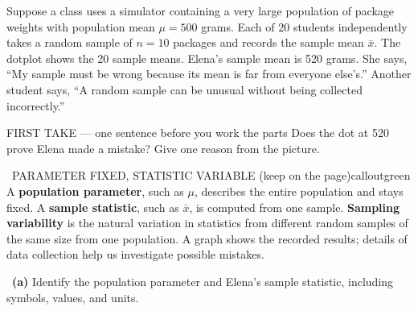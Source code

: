\documentclass[11pt]{article}
\begin{document}
Suppose a class uses a simulator containing a very large population of package weights with population mean $\mu=500$ grams. Each of 20 students independently takes a random sample of $n=10$ packages and records the sample mean $\bar{x}$. The dotplot shows the 20 sample means. Elena's sample mean is 520 grams. She says, ``My sample must be wrong because its mean is far from everyone else's.'' Another student says, ``A random sample can be unusual without being collected incorrectly.''\par
\begin{center}
\end{center}
\begin{firsttakebox}{FIRST TAKE --- one sentence before you work the parts}
Does the dot at 520 prove Elena made a mistake? Give one reason from the picture.\par
{}
\end{firsttakebox}

\begin{callout}{\IconBook\ PARAMETER FIXED, STATISTIC VARIABLE (keep on the page)}{calloutgreen}
A \textbf{population parameter}, such as $\mu$, describes the entire population and stays fixed.
A \textbf{sample statistic}, such as $\bar{x}$, is computed from one sample.
\textbf{Sampling variability} is the natural variation in statistics from different random samples of the same size from one population.
A graph shows the recorded results; details of data collection help us investigate possible mistakes.
\end{callout}

~\textbf{(a)} Identify the population parameter and Elena's sample statistic, including symbols, values, and units.\par
{}
\end{document}
